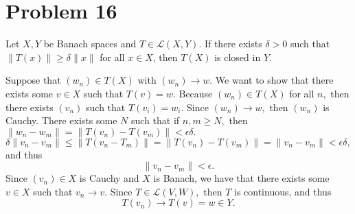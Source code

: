 \documentclass[11pt]{article}
\begin{document}
\section*{Problem 16}
\begin{problem}
    Let \( X, Y \) be Banach spaces and \( T \in \mathcal{L}(X, Y) \). If there exists \( \delta > 0 \) such that \( \|T(x)\| \geq \delta \|x\| \) for all \( x \in X \), then \( T(X) \) is closed in \( Y \).
\end{problem}
\begin{solution}
    Suppose that $(w_n) \in T(X)$ with $(w_n)\to w.$ We want to show that there exists some $v\in X$ such that $T(v) = w.$ Because $(w_n) \in T(X)$ for all $n,$ then there exists $(v_n)$ such that $T(v_i) = w_i.$ Since $(w_n) \to w,$ then $(w_n)$ is Cauchy. There exists some $N$ such that if $n, m \geq N,$ then $\|w_n - w_m\|  = \|T(v_n) - T(v_m)\| < \epsilon \delta.$ 
    \[\delta\|v_n - v_m\|\leq \|T(v_n - T_m)\| = \|T(v_n) - T(v_m)\| = \|v_n - v_m\|< \epsilon \delta,\] and thus 
    \[\|v_n - v_m\| < \epsilon.\] Since $(v_n) \in X$ is Cauchy and $X$ is Banach, we have that there exists some $v\in X$ such that $v_n \to v.$ Since $T\in \mathcal{L}(V,W),$ then $T$ is continuous, and thus 
    \[T(v_n) \to T(v) = w\in Y.\]
\end{solution}

\newpage
\end{document}
